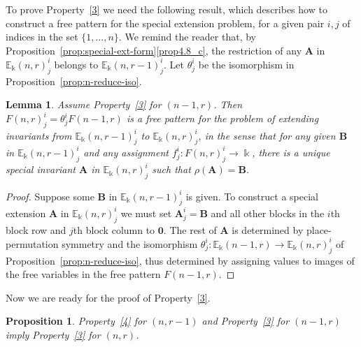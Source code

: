 \documentclass[10pt]{article}
\newtheorem{lemm}[theorem]{Lemma}
\newtheorem{prop}[theorem]{Proposition}
\theoremstyle{definition}
\newcommand{\E}{\mathbb{E}}
\newcommand{\bA}{\mathbf{A}}
\newcommand{\bB}{\mathbf{B}}
\newcommand{\bzero}{\mathbf{0}}
\begin{document}
To prove Property~\ref{3} we need the following result, which
describes how to construct a free pattern for the special extension
problem, for a given pair $i,j$ of indices in the set $\{1, \dots,
n\}$. We remind the reader that, by Proposition~\ref{prop:special-ext-form}\ref{prop4.8_c}, the restriction of any $\bA$ in
$\E_\Bbbk(n,r)^i_j$ belongs to $\E_\Bbbk(n,r-1)^i_j$. Let $\theta^i_j$
be the isomorphism in Proposition~\ref{prop:n-reduce-iso}.

\begin{lemm}\label{lem:free-special}
Assume Property~\ref{3} for $(n-1,r)$. Then $F(n,r)^i_j =
\theta^i_jF(n-1,r)$ is a free pattern for the problem of extending
invariants from $\E_\Bbbk(n,r-1)^i_j$ to $\E_\Bbbk(n,r)^i_j$, in the
sense that for any given $\bB$ in $\E_\Bbbk(n,r-1)^i_j$ and any
assignment $f^i_j: F(n,r)^i_j \to \Bbbk$, there is a unique special
invariant $\bA$ in $\E_\Bbbk(n,r)^i_j$ such that $\rho(\bA) = \bB$.
\end{lemm}

\begin{proof}
Suppose some $\bB$ in $\E_\Bbbk(n,r-1)^i_j$ is given. To construct a
special extension $\bA$ in $\E_\Bbbk(n,r)^i_j$ we must set $\bA^i_j =
\bB$ and all other blocks in the $i$th block row and $j$th block
column to $\bzero$. The rest of $\bA$ is determined by
place-permutation symmetry and the isomorphism $\theta^i_j:
\E_\Bbbk(n-1,r) \to \E_\Bbbk(n,r)^i_j$ of Proposition~\ref{prop:n-reduce-iso}, thus determined by assigning values to images
of the free variables in the free pattern $F(n-1,r)$.
\end{proof}


Now we are ready for the proof of Property~\ref{3}.

\begin{prop}\label{prop:free-ptns-exist}
 Property~\ref{4} for $(n,r-1)$ and Property~\ref{3} for $(n-1,r)$
 imply Property~\ref{3} for $(n,r)$.
\end{prop}
\end{document}
